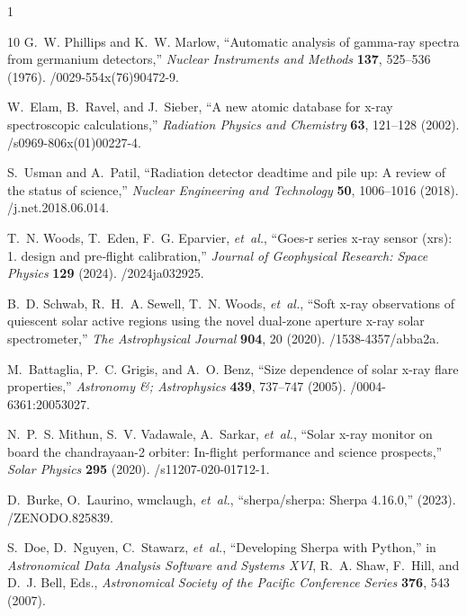 \documentclass[12pt]{spieman}  %
\begin{document}
\begin{spacing}{1}
\begin{thebibliography}{10}
G.~W. Phillips and K.~W. Marlow, ``Automatic analysis of gamma-ray spectra from germanium detectors,'' {\em Nuclear Instruments and Methods} {\bf 137}, 525–536  (1976).
/0029-554x(76)90472-9.


W.~Elam, B.~Ravel, and J.~Sieber, ``A new atomic database for x-ray spectroscopic calculations,'' {\em Radiation Physics and Chemistry} {\bf 63}, 121–128  (2002).
/s0969-806x(01)00227-4.

S.~Usman and A.~Patil, ``Radiation detector deadtime and pile up: A review of the status of science,'' {\em Nuclear Engineering and Technology} {\bf 50}, 1006–1016  (2018).
/j.net.2018.06.014.

T.~N. Woods, T.~Eden, F.~G. Eparvier, {\em et~al.}, ``Goes‐r series x‐ray sensor (xrs): 1. design and pre‐flight calibration,'' {\em Journal of Geophysical Research: Space Physics} {\bf 129}  (2024).
/2024ja032925.

B.~D. Schwab, R.~H.~A. Sewell, T.~N. Woods, {\em et~al.}, ``Soft x-ray observations of quiescent solar active regions using the novel dual-zone aperture x-ray solar spectrometer,'' {\em The Astrophysical Journal} {\bf 904}, 20  (2020).
/1538-4357/abba2a.

M.~Battaglia, P.~C. Grigis, and A.~O. Benz, ``Size dependence of solar x-ray flare properties,'' {\em Astronomy \&; Astrophysics} {\bf 439}, 737–747  (2005).
/0004-6361:20053027.

N.~P.~S. Mithun, S.~V. Vadawale, A.~Sarkar, {\em et~al.}, ``Solar x-ray monitor on board the chandrayaan-2 orbiter: In-flight performance and science prospects,'' {\em Solar Physics} {\bf 295}  (2020).
/s11207-020-01712-1.

D.~Burke, O.~Laurino, wmclaugh, {\em et~al.}, ``sherpa/sherpa: Sherpa 4.16.0,''  (2023).
/ZENODO.825839.

S.~{Doe}, D.~{Nguyen}, C.~{Stawarz}, {\em et~al.}, ``{Developing Sherpa with Python},'' in {\em Astronomical Data Analysis Software and Systems XVI},  R.~A. {Shaw}, F.~{Hill}, and D.~J. {Bell}, Eds., {\em Astronomical Society of the Pacific Conference Series} {\bf 376}, 543  (2007).

\end{thebibliography}



\end{spacing}
\end{document}
